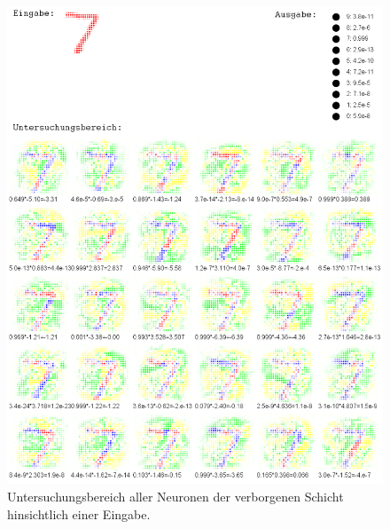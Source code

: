 \begin{figure}[hbt]
	\centering
	\includegraphics[scale=0.56]{Bilder/untersuchungsbereich_zahl}
	\caption{Untersuchungsbereich aller Neuronen der verborgenen Schicht hinsichtlich einer Eingabe.} 
	\label{fig:untersuchungsbereich_zahl} 
\end{figure}

